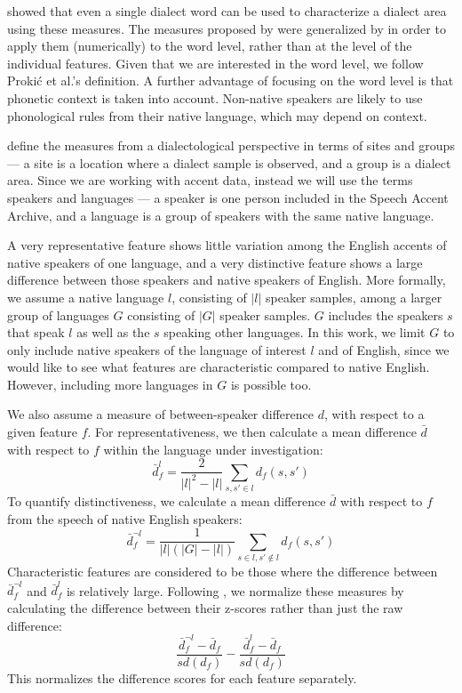 \documentclass[output=paper]{LSP/langsci}
\begin{document}
\citet{prokic_detecting_2012} showed that even a single dialect word can be used to characterize a dialect area using these measures. The measures proposed by \citet{wieling_bipartite_2011} were generalized by \citet{prokic_detecting_2012} in order to apply them (numerically) to the word level, rather than at the level of the individual features. Given that we are interested in the word level, we follow Proki\'{c} et al.'s definition. A further advantage of focusing on the word level is that phonetic context is taken into account. Non-native speakers are likely to use phonological rules from their native language, which may depend on context.

\citet{prokic_detecting_2012} define the measures from a dialectological perspective in terms of sites and groups --- a site is a location where a dialect sample is observed, and a group is a dialect area. Since we are working with accent data, instead we will use the terms speakers and languages --- a speaker is one person included in the Speech Accent Archive, and a language is a group of speakers with the same native language.

A very representative feature shows little variation among the English accents of native speakers of one language, and a very distinctive feature shows a large difference between those speakers and native speakers of English. More formally, we assume a native language $l$, consisting of $|l|$ speaker samples, among a larger group of languages $G$ consisting of $|G|$ speaker samples. $G$ includes the speakers $s$ that speak $l$ as well as the $s$ speaking other languages. In this work, we limit $G$ to only include native speakers of the language of interest $l$ and of English, since we would like to see what features are characteristic compared to native English. However, including more languages in $G$ is possible too.

We also assume a measure of between-speaker difference $d$, with respect to a given feature $f$. For representativeness, we then calculate a mean difference $\bar{d}$ with respect to $f$ within the language under investigation:
\begin{equation}
\bar{d}^l_f = \frac{2}{|l|^2 - |l|} \sum_{s,s' \in l} d_f(s,s')
\end{equation}
To quantify distinctiveness, we calculate a mean difference $\bar{d}$ with respect to $f$ from the speech of native English speakers:
\begin{equation}
\bar{d}^{\neg l}_f = \frac{1}{|l|(|G| - |l|)} \sum_{s \in l,s' \notin l} d_f(s,s')
\end{equation}
Characteristic features are considered to be those where the difference between $\bar{d}^{\neg l}_f$ and $\bar{d}^l_f$ is relatively large. Following \citet{prokic_detecting_2012}, we normalize these measures by calculating the difference between their z-scores rather than just the raw difference:
\begin{equation}
\frac{\bar{d}^{\neg l}_f - \bar{d}_f}{sd(d_f)} - \frac{\bar{d}^{l}_f - \bar{d}_f}{sd(d_f)}
\end{equation}
This normalizes the difference scores for each feature separately.
\end{document}
